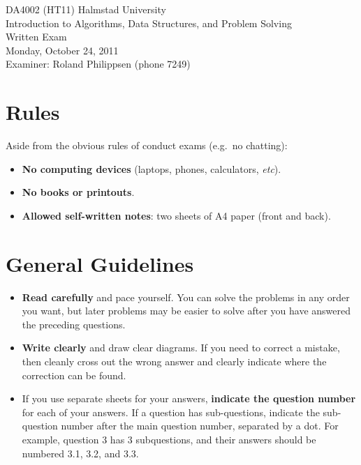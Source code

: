 \documentclass[a4paper]{article}
\newcounter{question}
\begin{document}
\pagestyle{empty}
\thispagestyle{empty}



\noindent
\begin{minipage}{\columnwidth}
  \centering
  \Large
  DA4002 (HT11) Halmstad University\\
  Introduction to Algorithms, Data Structures, and Problem Solving\\[3\baselineskip]
  \Huge
  Written Exam\\
  \Large
  Monday, October 24, 2011\\[2\baselineskip]
  Examiner: Roland Philippsen (phone 7249)
\end{minipage}

\vfill



\section*{Rules}

Aside from the obvious rules of conduct exams (e.g.\ no chatting):

\begin{itemize}
\item
  \textbf{No computing devices} (laptops, phones, calculators, \emph{etc}).
\item
  \textbf{No books or printouts}.
\item
  \textbf{Allowed self-written notes}: two sheets of A4 paper (front and back).
\end{itemize}



\section*{General Guidelines}

\begin{itemize}
\item
  \textbf{Read carefully} and pace yourself.
  You can solve the problems in any order you want, but later problems may be easier to solve after you have answered the preceding questions.
\item
  \textbf{Write clearly} and draw clear diagrams.
  If you need to correct a mistake, then cleanly cross out the wrong answer and clearly indicate where the correction can be found.
\item
  If you use separate sheets for your answers, \textbf{indicate the question number} for each of your answers.
  If a question has sub-questions, indicate the sub-question number after the main question number, separated by a dot.
  For example, question 3 has 3 subquestions, and their answers should be numbered 3.1, 3.2, and 3.3.
\end{itemize}
\end{document}
